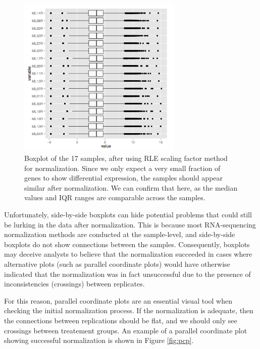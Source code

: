 \documentclass[11pt,a4paper,oldfontcommands,openany]{memoir}
\numberwithin{equation}{section} %
\begin{document}
\begin{figure}[H]
    \begin{framed}
    \centering
    \includegraphics[width=0.7\textwidth]{boxplotL120}
    \end{framed}
    \caption{Boxplot of the 17 samples, after using RLE scaling factor method for normalization. Since we only expect a very small fraction of genes to show differential expression, the samples should appear similar after normalization. We can confirm that here, as the median values and IQR ranges are comparable across the samples.}
    \label{fig:boxplotL120}
\end{figure}

Unfortunately, side-by-side boxplots can hide potential problems that could still be lurking in the data after normalization. This is because most RNA-sequencing normalization methods are conducted at the sample-level, and side-by-side boxplots do not show connections between the samples. Consequently, boxplots may deceive analysts to believe that the normalization succeeded in cases where alternative plots (such as parallel coordinate plots) would have otherwise indicated that the normalization was in fact unsuccessful due to the presence of inconsistencies (crossings) between replicates.

For this reason, parallel coordinate plots are an essential visual tool when checking the initial normalization process. If the normalization is adequate, then the connections between replications should be flat, and we should only see crossings between treatement groups. An example of a parallel coordinate plot showing successful normalization is shown in Figure \ref{fig:pcp}.
\end{document}
